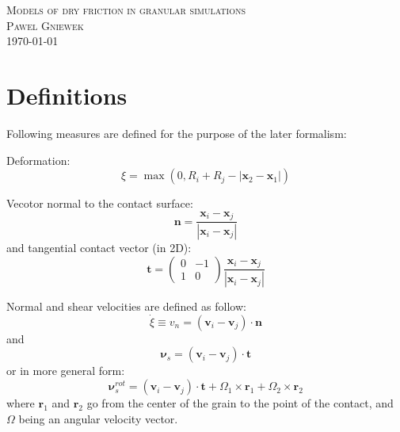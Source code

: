 \documentclass[10pt,a4paper]{article}
\begin{document}
\begin{center}
\textsc{\Large Models of dry friction in granular simulations}\\[1.0cm]
\textsc{\LARGE Pawel Gniewek}\\[1.0cm]
\vspace{0.5cm}
\today

\end{center}

\newpage

\section{Definitions}
Following measures are defined for the purpose of the later formalism:

Deformation:
\begin{equation}
 \xi = \max(0, R_i + R_j - |\mathbf{x}_2 - \mathbf{x}_1|)
\end{equation}

Vecotor normal to the contact surface:
\begin{equation}
 \mathbf{n} = \frac{\mathbf{x}_{i} - \mathbf{x}_j}{|\mathbf{x}_{i} - \mathbf{x}_j|}
\end{equation}
and tangential contact vector (in 2D):
\begin{equation}
 \mathbf{t} = \begin{pmatrix} 0 & -1 \\ 1 & 0 \end{pmatrix} \frac{\mathbf{x}_{i} - \mathbf{x}_j}{|\mathbf{x}_{i} - \mathbf{x}_j|}
\end{equation}


Normal and shear velocities are defined as follow:
\begin{equation}
 \dot{\xi} \equiv v_n = (\mathbf{v}_i - \mathbf{v}_j) \cdot \mathbf{n}
\end{equation}
and
\begin{equation} \label{eq:vs1}
 \mathbf{\nu}_s = (\mathbf{v}_i - \mathbf{v}_j) \cdot \mathbf{t}
\end{equation}
or in more general form:
\begin{equation}  \label{eq:vs2}
 \mathbf{\nu}^{rot}_s = (\mathbf{v}_i - \mathbf{v}_j) \cdot \mathbf{t} + \Omega_1 \times \mathbf{r}_1 + \Omega_2 \times \mathbf{r}_2
\end{equation}
where $\mathbf{r}_1$ and $\mathbf{r}_2$ go from the center of the grain to the point of the contact, and $\Omega$ being an angular velocity vector.
\end{document}
